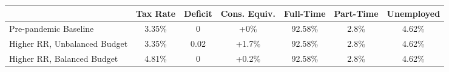 \begin{center}
\begin{adjustbox}{width=\textwidth}
\begin{tabular}{lcccccc}\toprule
 & Tax Rate & Deficit & Cons. Equiv. & Full-Time & Part-Time & Unemployed \\
\midrule
Pre-pandemic Baseline & 3.35\% & 0 & +0\% & 92.58\% & 2.8\% & 4.62\% \\
Higher RR, Unbalanced Budget & 3.35\% & 0.02 & +1.7\% & 92.58\% & 2.8\% & 4.62\% \\
Higher RR, Balanced Budget & 4.81\% & 0 & +0.2\% & 92.58\% & 2.8\% & 4.62\% \\
\bottomrule\end{tabular}
\end{adjustbox}
\end{center}